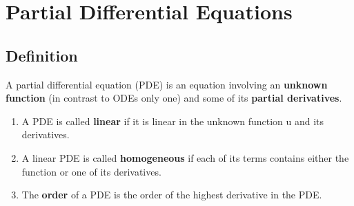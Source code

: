 \section{Partial Differential Equations}

\subsection{Definition}
A partial differential equation (PDE) is an equation involving an \textbf{unknown function} (in contrast to ODEs only one) and some of its \textbf{partial derivatives}.
\begin{enumerate}
    \item A PDE is called \textbf{linear} if it is linear in the unknown function u and its derivatives.
    \item A linear PDE is called \textbf{homogeneous} if each of its terms contains either the function or one of its derivatives.
    \item The \textbf{order} of a PDE is the order of the highest derivative in the PDE.\@
\end{enumerate}

